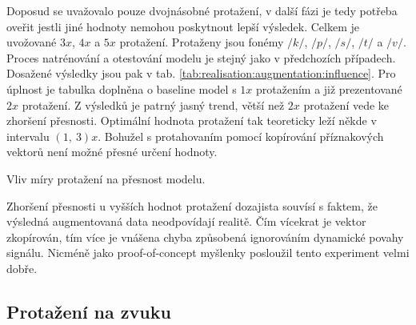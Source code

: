 Doposud se uvažovalo pouze dvojnásobné protažení, v další fázi je tedy potřeba oveřit jestli jiné hodnoty nemohou poskytnout lepší výsledek. Celkem je uvožované $3x$, $4x$ a $5x$ protažení. Protaženy jsou fonémy $/k/$, $/p/$, $/s/$, $/t/$ a $/v/$. Proces natrénování a otestování modelu je stejný jako v předchozích případech. Dosažené výsledky jsou pak v tab. \ref{tab:realisation:augmentation:influence}. Pro úplnost je tabulka doplněna o baseline model s $1x$ protažením a již prezentované $2x$ protažení. Z výsledků je patrný jasný trend, větší než $2x$ protažení vede ke zhoršení přesnosti. Optimální hodnota protažení tak teoreticky leží někde v intervalu $\left(1,\ 3\right)x$. Bohužel s protahovaním pomocí kopírování příznakových vektorů není možné přesné určení hodnoty.

\begin{table}[htpb]
  \centering
  \def\arraystretch{1.5}
  \caption{Vliv míry protažení na přesnost modelu.}
  \label{tab:realisation:augmentation:influence}
\end{table}

Zhoršení přesnosti u vyšších hodnot protažení dozajista souvísí s faktem, že výsledná augmentovaná data neodpovídají realitě. Čím vícekrat je vektor zkopírován, tím více je vnášena chyba způsobená ignorováním dynamické povahy signálu. Nicméně jako proof-of-concept myšlenky posloužil tento experiment velmi dobře.

\subsection{Protažení na zvuku}
\label{chap:realisation:augmentation:audio}

